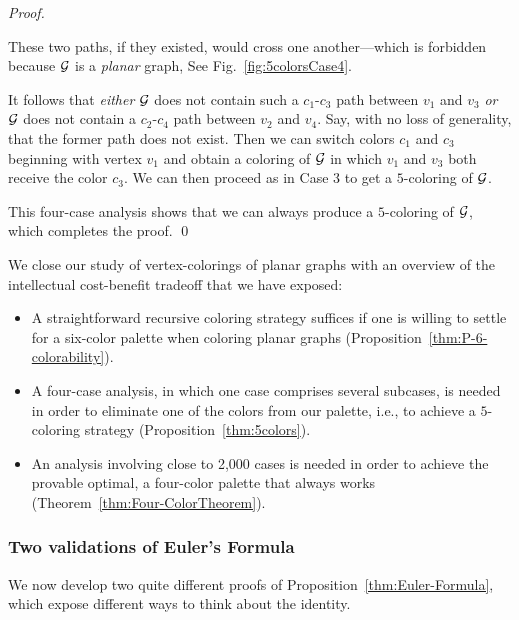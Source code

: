 \begin{proof}
\begin{itemize}
\smallskip

These two paths, if they existed, would cross one another---which is forbidden because $\mbox{$\cal G$}$ is a {\em planar} graph,  See Fig.~\ref{fig:5colorsCase4}.

\end{itemize}
It follows that {\em either} $\mbox{$\cal G$}$ does not contain such a $c_1$-$c_3$ path between $v_1$ and $v_3$ {\em or} $\mbox{$\cal G$}$ does not contain a $c_2$-$c_4$ path between $v_2$ and $v_4$.  Say, with no loss of generality, that the former path does not exist.  Then we can switch colors $c_1$ and $c_3$ beginning with vertex $v_1$ and obtain a coloring of $\mbox{$\cal G$}$ in which $v_1$ and $v_3$ both receive the color $c_3$.  We can then proceed as in Case 3 to get a $5$-coloring of $\mbox{$\cal G$}$.

\smallskip

This four-case analysis shows that we can always produce a $5$-coloring of $\mbox{$\cal G$}$, which completes the proof.  \qed
\end{proof}

\bigskip

We close our study of vertex-colorings of planar graphs with an overview of the intellectual cost-benefit tradeoff that we have exposed:
\begin{itemize}
\item
A straightforward recursive coloring strategy suffices if one is willing to settle for a six-color palette when coloring planar graphs (Proposition~\ref{thm:P-6-colorability}).
\medskip\item
A four-case analysis, in which one case comprises several subcases, is needed in order to eliminate one of the colors from our palette, i.e., to achieve a $5$-coloring strategy (Proposition~\ref{thm:5colors}).
\medskip\item
An analysis involving close to 2,000 cases is needed in order to achieve the provable optimal, a four-color palette that always works (Theorem~\ref{thm:Four-ColorTheorem}).
\end{itemize}

\subsubsection{Two validations of Euler's Formula}
\label{subsec:validationEulerFormula}

We now develop two quite different proofs of Proposition~\ref{thm:Euler-Formula}, which expose different ways to think about the identity.

